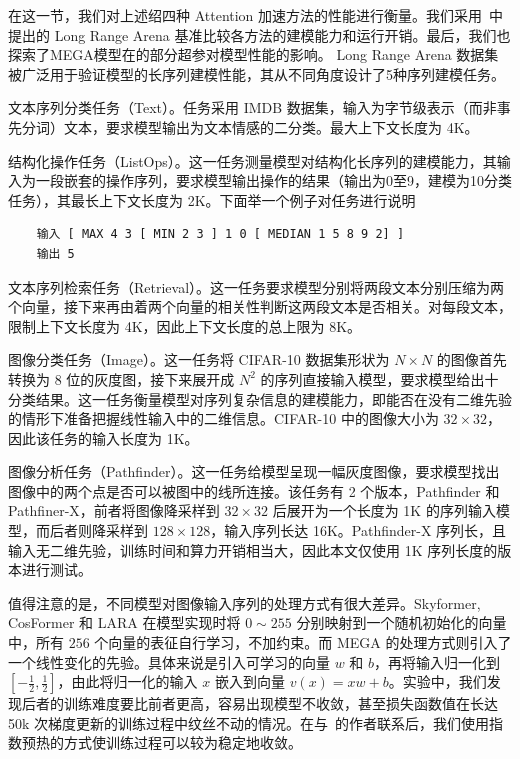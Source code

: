 在这一节，我们对上述绍四种 Attention 加速方法的性能进行衡量。我们采用~\cite{tay2021long}中提出的 Long Range Arena 基准比较各方法的建模能力和运行开销。最后，我们也探索了MEGA模型在的部分超参对模型性能的影响。
Long Range Arena 数据集~\cite{tay2021long} 被广泛用于验证模型的长序列建模性能，其从不同角度设计了5种序列建模任务。

文本序列分类任务（Text）。任务采用 IMDB 数据集，输入为字节级表示（而非事先分词）文本，要求模型输出为文本情感的二分类。最大上下文长度为 4K。

结构化操作任务（ListOps）。这一任务测量模型对结构化长序列的建模能力，其输入为一段嵌套的操作序列，要求模型输出操作的结果（输出为0至9，建模为10分类任务），其最长上下文长度为 2K。下面举一个例子对任务进行说明

\begin{verbatim}
    输入 [ MAX 4 3 [ MIN 2 3 ] 1 0 [ MEDIAN 1 5 8 9 2] ]
    输出 5
\end{verbatim}
    
文本序列检索任务（Retrieval）。这一任务要求模型分别将两段文本分别压缩为两个向量，接下来再由着两个向量的相关性判断这两段文本是否相关。对每段文本，限制上下文长度为 4K，因此上下文长度的总上限为 8K。

图像分类任务（Image）。这一任务将 CIFAR-10 数据集形状为 $N\times N$ 的图像首先转换为 8 位的灰度图，接下来展开成 $N^2$ 的序列直接输入模型，要求模型给出十分类结果。这一任务衡量模型对序列复杂信息的建模能力，即能否在没有二维先验的情形下准备把握线性输入中的二维信息。CIFAR-10 中的图像大小为 $32\times 32$，因此该任务的输入长度为 1K。

图像分析任务（Pathfinder）。这一任务给模型呈现一幅灰度图像，要求模型找出图像中的两个点是否可以被图中的线所连接。该任务有 2 个版本，Pathfinder 和 Pathfiner-X，前者将图像降采样到 $32\times 32$ 后展开为一个长度为 1K 的序列输入模型，而后者则降采样到 $128\times 128$，输入序列长达 16K。Pathfinder-X 序列长，且输入无二维先验，训练时间和算力开销相当大，因此本文仅使用 1K 序列长度的版本进行测试。

值得注意的是，不同模型对图像输入序列的处理方式有很大差异。Skyformer, CosFormer 和 LARA 在模型实现时将 $0\sim 255$ 分别映射到一个随机初始化的向量中，所有 $256$ 个向量的表征自行学习，不加约束。而 MEGA 的处理方式则引入了一个线性变化的先验。具体来说是引入可学习的向量 $w$ 和 $b$，再将输入归一化到 $[-\frac 1 2, \frac 1 2]$，由此将归一化的输入 $x$ 嵌入到向量 $v(x)=xw+b$。实验中，我们发现后者的训练难度要比前者更高，容易出现模型不收敛，甚至损失函数值在长达 50k 次梯度更新的训练过程中纹丝不动的情况。在与~\cite{ma2023mega}的作者联系后，我们使用指数预热的方式使训练过程可以较为稳定地收敛。


